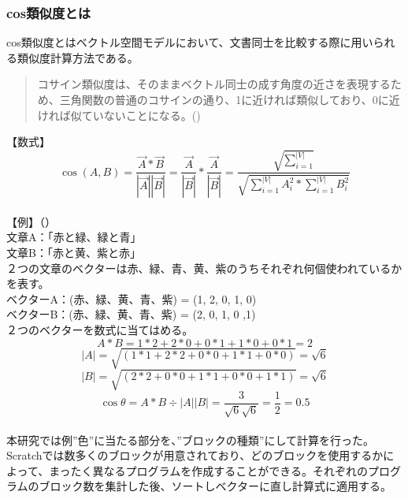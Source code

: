 \documentclass[a4paper,10pt,onecolumn,oneside,openany]{jsbook}
\begin{document}
\subsubsection{cos類似度とは}
cos類似度とはベクトル空間モデルにおいて、文書同士を比較する際に用いられる類似度計算方法である。
\begin{quote}
コサイン類似度は、そのままベクトル同士の成す角度の近さを表現するため、三角関数の普通のコサインの通り、1に近ければ類似しており、0に近ければ似ていないことになる。(\cite{cos})
\end{quote}
【数式】
\begin{equation}
\cos(A,B) = \frac{\vec{A} \ast\vec{B}} {|\vec{A}||\vec{B}|}  = \frac{\vec{A}}{|\vec{B}|}\ast\frac{\vec{A}}{|\vec{B}|} = \frac{\sqrt {\sum_{i=1}^{|V|}}}{\sqrt{\sum_{i=1}^{|V|}A_i^2\ast\sum_{i=1}^{|V|}B_i^2}}
\end{equation}
\\
【例】（\cite{tf_idf_cos}）
\\文章A：「赤と緑、緑と青」
\\文章B：「赤と黄、紫と赤」
\\２つの文章のベクターは赤、緑、青、黄、紫のうちそれぞれ何個使われているかを表す。
\\ベクターA：(赤、緑、黄、青、紫) = (1, 2, 0, 1, 0)
\\ベクターB：(赤、緑、黄、青、紫) = (2, 0, 1, 0 ,1)
\\２つのベクターを数式に当てはめる。
\begin{equation}
A \ast B = 1 \ast 2 + 2 \ast 0 + 0 \ast 1 + 1 \ast 0 + 0 \ast 1 = 2
\end{equation}
\begin{equation}
|A| = \sqrt{( 1 \ast 1 + 2 \ast 2 + 0 \ast 0 + 1 \ast 1 + 0 \ast 0 )} = \sqrt{6}
\end{equation}
\begin{equation}
|B| = \sqrt{( 2 \ast 2 + 0 \ast 0 + 1 \ast 1 + 0 \ast 0 + 1 \ast 1 )} = \sqrt{6}
\end{equation}
\begin{equation}
\cos\theta = A \ast B \div |A| |B| = \frac{3}{\sqrt{6}\sqrt{6}} = \frac{1}{2} = 0.5
\end{equation}
\\本研究では例”色”に当たる部分を、”ブロックの種類”にして計算を行った。Scratchでは数多くのブロックが用意されており、どのブロックを使用するかによって、まったく異なるプログラムを作成することができる。それぞれのプログラムのブロック数を集計した後、ソートしベクターに直し計算式に適用する。
\end{document}
